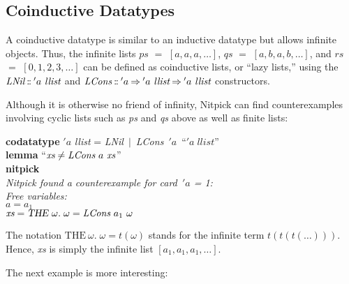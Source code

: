 \documentclass[a4paper,12pt]{article}
\def\Colon{\mathord{:\mkern-1.5mu:}}
\renewcommand\_{\hbox{\textunderscore\kern-.05ex}}
\begin{document}
\subsection{Coinductive Datatypes}
\label{coinductive-datatypes}

A coinductive datatype is similar to an inductive datatype but
allows infinite objects. Thus, the infinite lists $\textit{ps}$ $=$ $[a, a, a,
\ldots]$, $\textit{qs}$ $=$ $[a, b, a, b, \ldots]$, and $\textit{rs}$ $=$ $[0,
1, 2, 3, \ldots]$ can be defined as coinductive lists, or ``lazy lists,'' using the
$\textit{LNil}\mathbin{\Colon}{'}a~\textit{llist}$ and
$\textit{LCons}\mathbin{\Colon}{'}a \mathbin{\Rightarrow} {'}a~\textit{llist}
\mathbin{\Rightarrow} {'}a~\textit{llist}$ constructors.

Although it is otherwise no friend of infinity, Nitpick can find counterexamples
involving cyclic lists such as \textit{ps} and \textit{qs} above as well as
finite lists:

\prew
\textbf{codatatype} $'a$ \textit{llist} = \textit{LNil}~$\mid$~\textit{LCons}~$'a$~``$'a\;\textit{llist}$'' \\[2\smallskipamount]
\textbf{lemma} ``$\textit{xs} \not= \textit{LCons}~a~\textit{xs\/}$'' \\
\textbf{nitpick} \\[2\smallskipamount]
\slshape Nitpick found a counterexample for {\itshape card}~$'a$ = 1: \\[2\smallskipamount]
\hbox{}\qquad Free variables: \nopagebreak \\
\hbox{}\qquad\qquad $\textit{a} = a_1$ \\
\hbox{}\qquad\qquad $\textit{xs} = \textsl{THE}~\omega.\; \omega = \textit{LCons}~a_1~\omega$
\postw

The notation $\textrm{THE}~\omega.\; \omega = t(\omega)$ stands
for the infinite term $t(t(t(\ldots)))$. Hence, \textit{xs} is simply the
infinite list $[a_1, a_1, a_1, \ldots]$.

The next example is more interesting:
\end{document}
